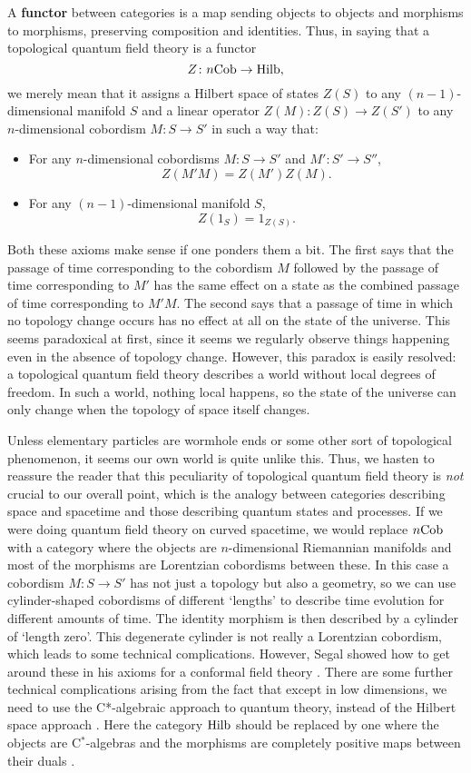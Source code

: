 \documentclass[12pt]{article}
\newcommand{\Hilb}{{\rm Hilb}}
\newcommand{\Cob}{{\rm Cob}}
\renewcommand{\to}{\rightarrow}
\newcommand{\maps}{\colon}
\begin{document}
A {\bf functor} between categories is a map sending objects to objects
and morphisms to morphisms, preserving composition and identities.  Thus, 
in saying that a topological quantum field theory is a functor
\[            Z \maps n\Cob \to \Hilb  , \]
we merely mean that it assigns a Hilbert space of states $Z(S)$ to 
any $(n-1)$-dimensional manifold $S$ and a linear operator 
$Z(M) \maps Z(S) \to Z(S')$ to any $n$-dimensional cobordism 
$M \maps S \to S'$ in such a way that:
\begin{itemize}
\item For any $n$-dimensional cobordisms 
$M \maps S \to S'$ and $M' \maps S' \to S''$, 
\[                Z(M'M) = Z(M')Z(M) .  \]
\item For any $(n-1)$-dimensional manifold $S$, 
\[                Z(1_S) = 1_{Z(S)}  .\] 
\end{itemize} 
Both these axioms make sense if one ponders them a bit. 
The first says that the passage of time corresponding to the cobordism 
$M$ followed by the passage of time corresponding to $M'$ has the  same
effect on a state as the combined passage of time corresponding to
$M'M$.  The second says that a passage of time in which no topology 
change occurs has no effect at all on the state of the universe.  This
seems paradoxical at first, since it seems we regularly observe things 
happening even in the absence of topology change.   However, this
paradox is easily resolved: a topological quantum field theory describes 
a world without local degrees of freedom.   In 
such a world, nothing local happens, so the state of the universe can 
only change when the topology of space itself changes.  

Unless elementary particles are wormhole ends or some other sort
of topological phenomenon, it seems our own world is quite unlike 
this.  Thus, we hasten to reassure the 
reader that this peculiarity of topological quantum field theory is 
{\it not} crucial to our overall point, which is the analogy between 
categories describing space and spacetime and those describing quantum 
states and processes.  If we were doing quantum field theory on curved 
spacetime, we would replace $n\Cob$ with a category where the objects 
are $n$-dimensional Riemannian manifolds and most of the morphisms are 
Lorentzian cobordisms between these.  In this case a cobordism 
$M \maps S \to S'$ has not just a topology but also a geometry, so we 
can use cylinder-shaped cobordisms of different `lengths' to describe 
time evolution for different amounts of time.  The identity morphism 
is then described by a cylinder of `length zero'.  This degenerate
cylinder is not really a Lorentzian cobordism, which leads to some 
technical complications.  However, Segal showed how to get around these
in his axioms for a conformal field theory \cite{Segal}.  There are 
some further technical complications arising from the fact that except 
in low dimensions, we need to use the C*-algebraic approach to quantum 
theory, instead of the Hilbert space approach \cite{Earman}.  Here the
category $\Hilb$ should be replaced by one where the objects are 
C$^*$-algebras and the morphisms are completely positive maps between
their duals \cite{HMS}.
\end{document}
